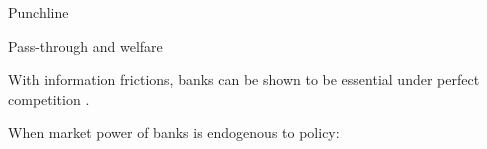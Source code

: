\documentclass[10pt,english,slidetop,compress,
              blue,mathserif,color=option]{beamer}
\theoremstyle{plain}
\theoremstyle{definition}
\begin{document}
\begin{frame}[allowframebreaks]{Punchline}


  \alert{Pass-through and welfare}

  \bigskip

  With information frictions, banks can be shown to be essential under perfect competition \citep{Berentsen2007}.



  \bigskip

  When market power of banks is endogenous to policy:

   \bigskip


\end{frame}
\end{document}
